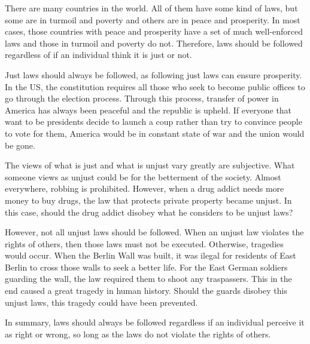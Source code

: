 \documentclass{article}
\begin{document}
    There are many countries in the world. All of them have some kind of laws,
    but some are in turmoil and poverty and others are in peace and prosperity.
    In most cases, those countries with peace and prosperity have a set of much
    well-enforced laws and those in turmoil and poverty do not. Therefore,
    laws should be followed regardless of if an individual think it is just
    or not.

    Just laws should always be followed, as following just laws can ensure
    prosperity. In the US, the constitution requires all those who seek
    to become public offices to go through the election process. Through this
    process, transfer of power in America has always been peaceful and
    the republic is upheld. If everyone
    that want to be presidents decide to launch a coup rather than try to
    convince people to vote for them, America would be in constant state of
    war and the union would be gone.

    The views of what is just and what is unjust vary greatly are subjective.
    What someone views as unjust could be for the betterment of the society.
    Almost everywhere, robbing is prohibited. However, when a drug addict needs
    more money to buy drugs, the law that protects private property became
    unjust. In this case, should the drug addict disobey what he considers
    to be unjust laws?

    However, not all unjust laws should be followed. When an unjust law
    violates the rights of others, then those laws must not be executed.
    Otherwise, tragedies would occur.
    When the Berlin Wall was built, it was ilegal for residents of East Berlin
    to cross those walls to seek a better life. For the East German soldiers
    guarding the wall, the law required them to shoot any traspassers.
    This in the end caused a great tragedy in human history. Should the
    guards disobey this unjust laws, this tragedy could have been prevented.

    In summary, laws should always be followed regardless if an individual
    perceive it as right or wrong, so long as the laws do not violate the
    rights of others.
\end{document}
